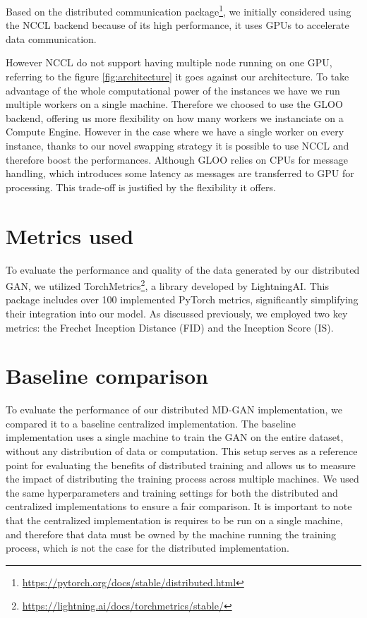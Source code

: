 Based on the distributed communication package\footnote{\url{https://pytorch.org/docs/stable/distributed.html}}, we initially considered using the NCCL backend because of its high performance, it uses GPUs to accelerate data communication.

However NCCL do not support having multiple node running on one GPU, referring to the figure \ref{fig:architecture} it goes against our architecture. To take advantage of the whole computational power of the instances we have we run multiple workers on a single machine. Therefore we choosed to use the GLOO backend, offering us more flexibility on how many workers we instanciate on a Compute Engine. However in the case where we have a single worker on every instance, thanks to our novel swapping strategy it is possible to use NCCL and therefore boost the performances. Although GLOO relies on CPUs for message handling, which introduces some latency as messages are transferred to GPU for processing. This trade-off is justified by the flexibility it offers.

\section{Metrics used}
To evaluate the performance and quality of the data generated by our distributed GAN, we utilized TorchMetrics\footnote{\url{https://lightning.ai/docs/torchmetrics/stable/}}, a library developed by LightningAI. This package includes over 100 implemented PyTorch metrics, significantly simplifying their integration into our model. As discussed previously, we employed two key metrics: the Frechet Inception Distance (FID) and the Inception Score (IS).

\section{Baseline comparison}
To evaluate the performance of our distributed MD-GAN implementation, we compared it to a baseline centralized implementation. The baseline implementation uses a single machine to train the GAN on the entire dataset, without any distribution of data or computation. This setup serves as a reference point for evaluating the benefits of distributed training and allows us to measure the impact of distributing the training process across multiple machines. We used the same hyperparameters and training settings for both the distributed and centralized implementations to ensure a fair comparison. It is important to note that the centralized implementation is requires to be run on a single machine, and therefore that data must be owned by the machine running the training process, which is not the case for the distributed implementation.

